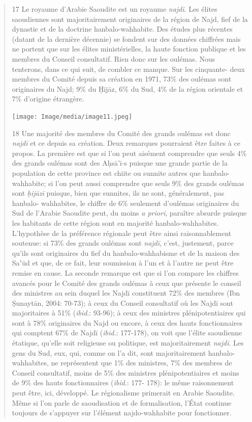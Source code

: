 \begin{quote}
17 Le royaume d'Arabie Saoudite est un royaume \emph{najdī}. Les élites
saoudiennes sont majoritairement originaires de la région de Najd, fief
de la dynastie et de la doctrine hanbalo-wahhabite. Des études plus
récentes (datant de la dernière décennie) se fondent sur des données
chiffrées mais ne portent que sur les élites ministérielles, la haute
fonction publique et les membres du Conseil consultatif. Rien donc sur
les oulémas. Nous tenterons, dans ce qui suit, de combler ce manque. Sur
les cinquante- deux membres du Comité depuis sa création en 1971, 73\%
des oulémas sont originaires du Najd; 9\% du Ḥijāz, 6\% du Sud, 4\% de
la région orientale et 7\% d'origine étrangère.

\texttt{[image: Image/media/image11.jpeg]}

18 Une majorité des membres du Comité des grands oulémas est donc
\emph{najdī} et ce depuis sa création. Deux remarques pourraient être
faites à ce propos. La première est que si l'on peut aisément comprendre
que seuls 4\% des grands oulémas sont des Aḥsā'ī-s puisque une grande
partie de la population de cette province est chiite ou sunnite autres
que hanbalo-wahhabite; si l'on peut aussi comprendre que seuls 9\% des
grands oulémas sont \emph{ḥijāzī} puisque, bien que sunnites, ils ne
sont, généralement, pas hanbalo- wahhabites, le chiffre de 6\% seulement
d'oulémas originaires du Sud de l'Arabie Saoudite peut, du moins \emph{a
priori}, paraître absurde puisque les habitants de cette région sont en
majorité hanbalo-wahhabites. L'hypothèse de la préférence régionale peut
être ainsi raisonnablement soutenue: si 73\% des grands oulémas sont
\emph{najdī}, c'est, justement, parce qu'ils sont originaires du fief du
hanbalo-wahhabisme et de la maison
des Sa‛ūd et que, de ce fait, leur soumission à l'un et à l'autre ne
peut être remise en cause. La seconde remarque est que si l'on compare
les chiffres avancés pour le Comité des grands oulémas à ceux que
présente le conseil des ministres au sein duquel les Najdī constituent
72\% des membres (Ibn Ṣunaytān, 2004: 70-73); à ceux du Conseil
consultatif où les Najdī sont majoritaires à 51\% (\emph{ibid}.: 93-96);
à ceux des ministres plénipotentiaires qui sont à 78\% originaires du
Najd ou encore, à ceux des hauts fonctionnaires qui comptent 67\% de
Najdī (\emph{ibid}.: 177-178), on voit que l'élite saoudienne étatique,
qu'elle soit religieuse ou politique, est majoritairement \emph{najdī}.
Les gens du Sud, eux, qui, comme on l'a dit, sont majoritairement
hanbalo-wahhabites, ne représentent que 1\% des ministres, 7\% des
membres de Conseil consultatif, moins de 5\% des ministres
plénipotentiaires et moins de 9\% des hauts fonctionnaires
(\emph{ibid}.: 177- 178): le même raisonnement peut être, ici,
développé. Le régionalisme primerait en Arabie Saoudite. Même si l'on
parle de saoudisation et de formalisation, l'État continue toujours de
s'appuyer sur l'élément najdo-wahhabite pour fonctionner.


\end{quote}
